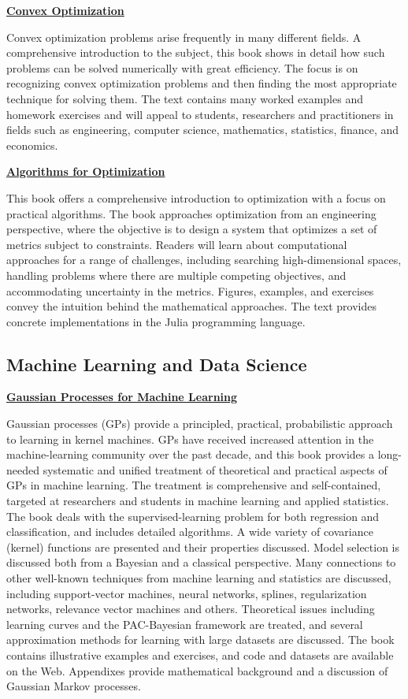 \textbf{\href{https://a.co/d/aGdrLVM}{Convex Optimization}}

Convex optimization problems arise frequently in many different fields. A comprehensive introduction to the subject, this book shows in detail how such problems can be solved numerically with great efficiency. The focus is on recognizing convex optimization problems and then finding the most appropriate technique for solving them. The text contains many worked examples and homework exercises and will appeal to students, researchers and practitioners in fields such as engineering, computer science, mathematics, statistics, finance, and economics.

\textbf{\href{https://a.co/d/e8KNurs}{Algorithms for Optimization}}

This book offers a comprehensive introduction to optimization with a focus on practical algorithms. The book approaches optimization from an engineering perspective, where the objective is to design a system that optimizes a set of metrics subject to constraints. Readers will learn about computational approaches for a range of challenges, including searching high-dimensional spaces, handling problems where there are multiple competing objectives, and accommodating uncertainty in the metrics. Figures, examples, and exercises convey the intuition behind the mathematical approaches. The text provides concrete implementations in the Julia programming language.


\subsection{Machine Learning and Data Science}
\label{sub_sec:ML_DS_Books}

\textbf{\href{https://a.co/d/aCCUuaQ}{Gaussian Processes for Machine Learning}}

Gaussian processes (GPs) provide a principled, practical, probabilistic approach to learning in kernel machines. GPs have received increased attention in the machine-learning community over the past decade, and this book provides a long-needed systematic and unified treatment of theoretical and practical aspects of GPs in machine learning. The treatment is comprehensive and self-contained, targeted at researchers and students in machine learning and applied statistics. The book deals with the supervised-learning problem for both regression and classification, and includes detailed algorithms. A wide variety of covariance (kernel) functions are presented and their properties discussed. Model selection is discussed both from a Bayesian and a classical perspective. Many connections to other well-known techniques from machine learning and statistics are discussed, including support-vector machines, neural networks, splines, regularization networks, relevance vector machines and others. Theoretical issues including learning curves and the PAC-Bayesian framework are treated, and several approximation methods for learning with large datasets are discussed. The book contains illustrative examples and exercises, and code and datasets are available on the Web. Appendixes provide mathematical background and a discussion of Gaussian Markov processes.
\newpage